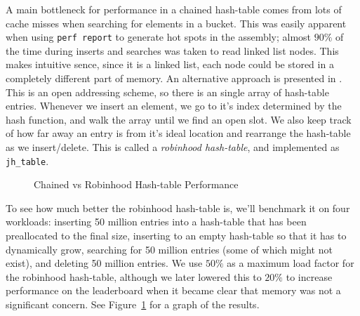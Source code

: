 \documentclass[a4paper, 12pt]{article}
\begin{document}
\medskip
A main bottleneck for performance in a chained hash-table comes from lots of cache misses when searching for elements in a bucket. This was easily apparent when using \texttt{perf report} to generate hot spots in the assembly; almost $90\%$ of the time during inserts and searches was taken to read linked list nodes. This makes intuitive sence, since it is a linked list, each node could be stored in a completely different part of memory. An alternative approach is presented in \cite{hash}. This is an open addressing scheme, so there is an single array of hash-table entries. Whenever we insert an element, we go to it's index determined by the hash function, and walk the array until we find an open slot. We also keep track of how far away an entry is from it's ideal location and rearrange the hash-table as we insert/delete. This is called a \textit{robinhood hash-table}, and implemented as \texttt{jh\_table}.

\begin{figure}[ht]
    \begin{center}
        \caption{Chained vs Robinhood Hash-table Performance}
        \label{fig:ch_vs_rh}
    \end{center}
\end{figure}

\medskip
To see how much better the robinhood hash-table is, we'll benchmark it on four workloads: inserting 50 million entries into a hash-table that has been preallocated to the final size, inserting to an empty hash-table so that it has to dynamically grow, searching for 50 million entries (some of which might not exist), and deleting 50 million entries. We use $50\%$ as a maximum load factor for the robinhood hash-table, although we later lowered this to $20\%$ to increase performance on the leaderboard when it became clear that memory was not a significant concern. See Figure~\ref{fig:ch_vs_rh} for a graph of the results.
\end{document}
